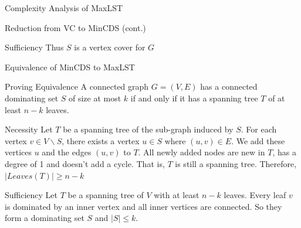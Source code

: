 \documentclass[xcolor=svgnames]{beamer}
\begin{document}
\begin{section}{Complexity Analysis of MaxLST}
\begin{frame}{Reduction from VC to MinCDS (cont.)}
\begin{block}{Sufficiency}
            Thus $S$ is a vertex cover for $G$
        \end{block}
    \end{frame}
    \begin{frame}{Equivalence of MinCDS to MaxLST}
        \small
        \begin{block}{Proving Equivalence}
             A connected graph $G = (V, E)$ has a connected dominating set $S$ of size at most $k$ if and only if it has a spanning tree $T$ of at least $n - k$ leaves.
        \end{block}
        \pause
        \begin{block}{Necessity}
             Let $T$ be a spanning tree of the sub-graph induced by $S$. For each vertex $v \in V \backslash S$, there exists a vertex $u \in S$ where $(u,v) \in E$. We add these vertices $u$ and the edges $(u, v)$ to $T$. All newly added nodes are new in $T$, has a degree of 1 and doesn't add a cycle. That is, $T$ is still a spanning tree. Therefore, $|Leaves(T)| \geq n - k$
        \end{block}
        \pause
        \begin{block}{Sufficiency}
            Let $T$ be a spanning tree of $V$ with at least $n-k$ leaves. Every leaf $v$ is dominated by an inner vertex and all inner vertices are connected. So they form a dominating set $S$ and $|S| \leq k$.
        \end{block}
    \end{frame}
\end{section}
\end{document}
